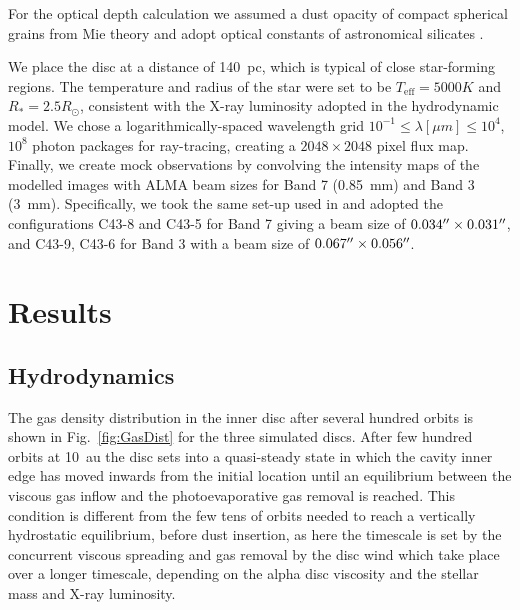 \documentclass[fleqn,usenatbib]{mnras}
\begin{document}
         For the optical depth calculation we assumed a dust opacity of compact spherical grains from Mie theory and adopt optical constants of astronomical silicates \citep{Draine2003}.

         We place the disc at a distance of \SI{140}{pc}, which is typical of close star-forming regions.
         The temperature and radius of the star were set to be $T_\mathrm{eff}=5000 K$ and $R_*=2.5 R_\odot$, consistent with the X-ray luminosity adopted in the hydrodynamic model.
         We chose a logarithmically-spaced wavelength grid $10^{-1} \leq \lambda [\mu m] \leq 10^4$, $10^8$ photon packages for ray-tracing, creating a $2048\times2048$ pixel flux map.
         Finally, we create mock observations by convolving the intensity maps of the modelled images with ALMA beam sizes for Band 7 (\SI{0.85}{mm}) and Band 3 (\SI{3}{mm}). Specifically, we took the same set-up used in \cite{Nazari_2019} and adopted the configurations C43-8 and C43-5 for Band 7 giving a beam size of $0.034 \hbox{$^{\prime\prime}$} \times 0.031 \hbox{$^{\prime\prime}$}$, and C43-9, C43-6 for Band 3 with a beam size of $0.067 \hbox{$^{\prime\prime}$} \times 0.056 \hbox{$^{\prime\prime}$}$.

\section{Results}\label{sec:results}

    \subsection{Hydrodynamics} \label{sec:results-gas}

        The gas density distribution in the inner disc after several hundred orbits is shown in Fig.~\ref{fig:GasDist} for the three simulated discs. After few hundred orbits at \SI{10}{au} the disc sets into a quasi-steady state in which the cavity inner edge has moved inwards from the initial location until an equilibrium between the viscous gas inflow and the photoevaporative gas removal is reached. This condition is different from the few tens of orbits needed to reach a vertically hydrostatic equilibrium, before dust insertion, as here the timescale is set by the concurrent viscous spreading and gas removal by the disc wind which take place over a longer timescale, depending on the alpha disc viscosity and the stellar mass and X-ray luminosity.
\end{document}
